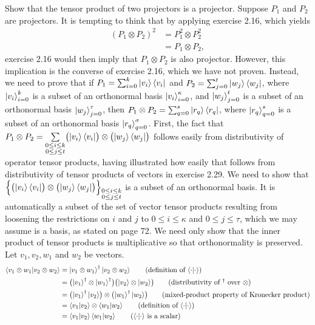  Show that the tensor product of two projectors is a projector.
\Soln
Suppose $P_1$ and $P_2$  are projectors. It is tempting to think that by applying exercise 2.16, which yields
\begin{align*}
	(P_1 \otimes P_2) ^2 &= P_1^2 \otimes P_2^2 \tag{tensor product is multiplicative}\\
		&= P_1 \otimes P_2 \tag{exercise 2.16},
\end{align*}
exercise 2.16 would then imply that $ P_1 \otimes P_2$ is also projector. However, this implication is the converse of exercise 2.16, which we have not proven.  Instead, we need to prove that if $P_1 = \sum_{i=0}^k\ket{v_i}\bra{v_i}$ and $P_2=\sum_{j=0}^t\ket{w_j}\bra{w_j}$, where $\ket{v_i}_{i=0}^k$ is a subset of an orthonormal basis $\ket{v_i}_{i=0}^{\kappa}$, and $\ket{w_j}_{j=0}^t$ is a subset of an orthonormal basis $\ket{w_j}_{j=0}^\tau$, then $P_1\otimes P_2 = \sum_{q=0}^s \ket{r_q}\bra{r_q}$, where $\ket{r_q}_{q=0}^{s}$ is a subset of an orthonormal basis $\ket{r_q}_{q=0}^\sigma$.  First, the fact that  $P_1\otimes P_2 = \sum\limits_{\substack{0\leq i\leq k\\0\leq j\leq t}} \bigl(\ket{v_i}\bra{v_i}\bigr)\otimes\bigl(\ket{w_j}\bra{w_j}\bigr)$ follows easily from distributivity of operator tensor products, having illustrated how easily that follows from distributivity of tensor products of vectors in exercise 2.29.  We need to show that $\Bigl\{\bigl(\ket{v_i}\bra{v_i}\bigr)\otimes\bigl(\ket{w_j}\bra{w_j}\bigr)\Bigr\}_{\substack{0\leq i\leq k\\0\leq j\leq t}}$ is a subset of an orthonormal basis.  It is automatically a subset of the set of vector tensor products resulting from loosening the restrictions on $i$ and $j$ to $0\leq i \leq \kappa$ and $0\leq j \leq \tau$, which we may assume is a basis, as stated on page 72.  We need only show that the inner product of tensor products is multiplicative so that orthonormality is preserved.  Let $v_1,v_2,w_1$ and $w_2$ be vectors.
\begin{align*}
\braket{v_1\otimes w_1 | v_2\otimes w_2} &= \ket{v_1\otimes w_1}^\dagger \ket{v_2\otimes w_2} \tag{definition of $\braket{\cdot | \cdot}$}\\
&= \bigl(\ket{v_1}^\dagger\otimes\ket{w_1}^\dagger\bigr)\bigl(\ket{v_2}\otimes\ket{w_2}\bigr) \tag{distributivity of $^\dagger$ over $\otimes$} \\
&= \bigl(\ket{v_1}^\dagger\ket{v_2}\bigr)\otimes\bigl(\ket{w_1}^\dagger\ket{w_2}\bigr) \tag{mixed-product property of Kronecker product} \\
&= \braket{v_1|v_2}\otimes\braket{w_1|w_2} \tag{definition of $\braket{\cdot|\cdot}$}\\
&= \braket{v_1|v_2}\braket{w_1|w_2} \tag{$\braket{\cdot|\cdot}$ is a scalar}
\end{align*} 

